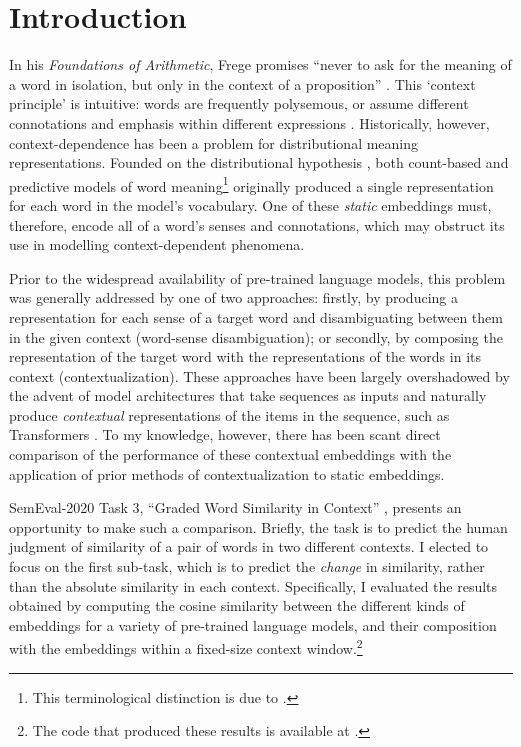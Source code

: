 \section{Introduction}
\label{sec:introduction}

In his \emph{Foundations of Arithmetic}, Frege promises ``never to ask for the meaning
of a word in isolation, but only in the context of a proposition''
\parencites*[xvii]{Frege1960}.
This `context principle' is intuitive: words are frequently polysemous, or assume
different connotations and emphasis within different expressions
\parencites[2-3]{Armendariz2020}.
Historically, however, context-dependence has been a problem for distributional meaning
representations.
Founded on the distributional hypothesis \parencites[e.g.,][142-143]{Turney2010}, both
count-based and predictive models of word meaning\footnote{This terminological
  distinction is due to \textcites{Baroni2014a}.
} originally
produced a single representation for each word in the model's vocabulary.
One of these \emph{static} embeddings must, therefore, encode all of a word's senses
and connotations, which may obstruct its use in modelling context-dependent phenomena.

Prior to the widespread availability of pre-trained language models, this problem was
generally addressed by one of two approaches: firstly, by producing a representation
for each sense of a target word and disambiguating between them in the given context
(word-sense disambiguation); or secondly, by composing the representation of the target
word with the representations of the words in its context (contextualization).
These approaches have been largely overshadowed by the advent of model architectures
that take sequences as inputs and naturally produce \emph{contextual} representations
of the items in the sequence, such as Transformers \parencites{Vaswani2017}.
To my knowledge, however, there has been scant direct comparison of the performance of
these contextual embeddings with the application of prior methods of contextualization
to static embeddings.

SemEval-2020 Task 3, ``Graded Word Similarity in Context''
\parencites{Armendariz2020a}, presents an opportunity to make such a comparison.
Briefly, the task is to predict the human judgment of similarity of a pair of words in
two different contexts.
I elected to focus on the first sub-task, which is to predict the \emph{change} in
similarity, rather than the absolute similarity in each context.
Specifically, I evaluated the results obtained by computing the cosine similarity
between the different kinds of embeddings for a variety of pre-trained language models,
and their composition with the embeddings within a fixed-size context
window.\footnote{The code that produced these results is available at
  .
}
